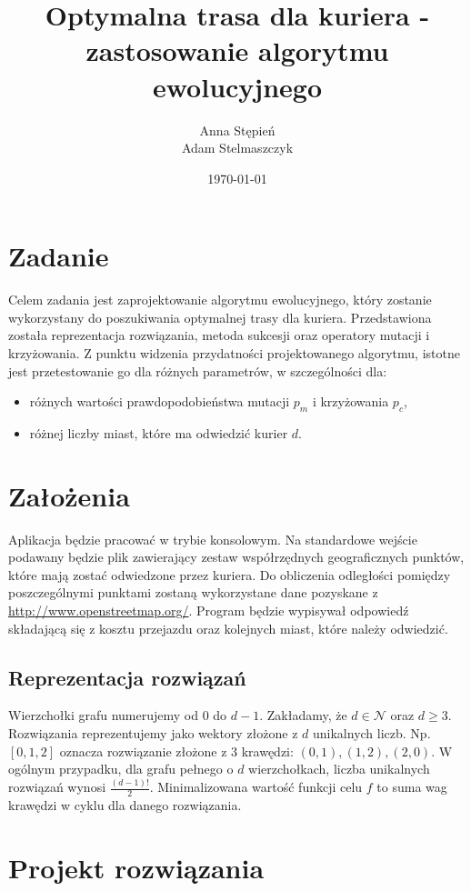 \documentclass[12pt, a4paper]{article}
\title{\textbf{Optymalna trasa dla kuriera - zastosowanie algorytmu ewolucyjnego}}
\author{Anna Stępień \\ Adam Stelmaszczyk}
\date{\today}
\begin{document}
\maketitle

\section{Zadanie}
Celem zadania jest zaprojektowanie algorytmu ewolucyjnego, który zostanie wykorzystany do poszukiwania optymalnej trasy dla kuriera.
Przedstawiona została reprezentacja rozwiązania, metoda sukcesji oraz operatory mutacji i krzyżowania. 
Z punktu widzenia przydatności projektowanego algorytmu, istotne jest przetestowanie go dla różnych parametrów, w szczególności dla:
\begin{itemize}
	\item różnych wartości prawdopodobieństwa mutacji $p_m$ i krzyżowania $p_c$,
	\item różnej liczby miast, które ma odwiedzić kurier $d$.
\end{itemize}

\section{Założenia}
Aplikacja będzie pracować w trybie konsolowym. Na standardowe wejście podawany będzie plik zawierający zestaw współrzędnych geograficznych punktów, które mają zostać odwiedzone przez kuriera. Do obliczenia odległości pomiędzy poszczególnymi punktami zostaną wykorzystane dane pozyskane z \url{http://www.openstreetmap.org/}.
Program będzie wypisywał odpowiedź składającą się z kosztu przejazdu oraz kolejnych miast, które należy odwiedzić.

\subsection{Reprezentacja rozwiązań}

Wierzchołki grafu numerujemy od 0 do $d - 1$. Zakładamy, że $d \in \mathcal{N}$ oraz $d \geq 3$. 
Rozwiązania reprezentujemy jako wektory złożone z $d$ unikalnych liczb. 
Np. $[0,1,2]$ oznacza rozwiązanie złożone z 3 krawędzi: $(0,1), (1,2), (2,0)$. 
W ogólnym przypadku, dla grafu pełnego o $d$ wierzchołkach, liczba unikalnych rozwiązań wynosi $\frac{(d-1)!}{2}$. 
Minimalizowana wartość funkcji celu $f$ to suma wag krawędzi w cyklu dla danego rozwiązania.

\section{Projekt rozwiązania}
\end{document}
